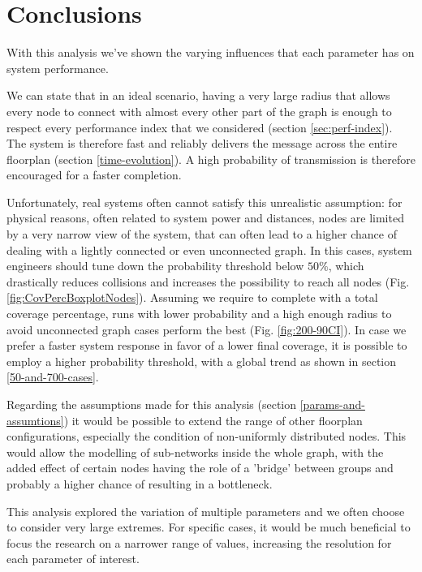 \section{Conclusions}
With this analysis we've shown the varying influences that each parameter has on system performance. 

We can state that in an ideal scenario, having a very large radius that allows every node to connect with almost every other part of the graph is  enough to respect every performance index that we considered (section \ref{sec:perf-index}). The system is therefore fast and reliably delivers the message across the entire floorplan (section \ref{time-evolution}). A high probability of transmission is therefore encouraged for a faster completion.

Unfortunately, real systems often cannot satisfy this unrealistic assumption: for physical reasons, often related to system power and distances, nodes are limited by a very narrow view of the system, that can often lead to a higher chance of dealing with a lightly connected or even unconnected graph. In this cases, system engineers should tune down the probability threshold below $50\%$, which drastically reduces collisions and increases the possibility to reach all nodes (Fig. \ref{fig:CovPercBoxplotNodes}). Assuming we require to complete with a total coverage percentage, runs with lower probability and a high enough radius to avoid unconnected graph cases perform the best (Fig. \ref{fig:200-90CI}). In case we prefer a faster system response in favor of a lower final coverage, it is possible to employ a higher probability threshold, with a global trend as shown in section \ref{50-and-700-cases}.

Regarding the assumptions made for this analysis (section \ref{params-and-assumtions}) it would be possible to extend the range of other floorplan configurations, especially the condition of non-uniformly distributed nodes. This would allow the modelling of sub-networks inside the whole graph, with the added effect of certain nodes having the role of a 'bridge' between groups and probably a higher chance of resulting in a bottleneck.

This analysis explored the variation of multiple parameters and we often choose to consider very large extremes. For specific cases, it would be much beneficial to focus the research on a narrower range of values, increasing the resolution for each parameter of interest.
